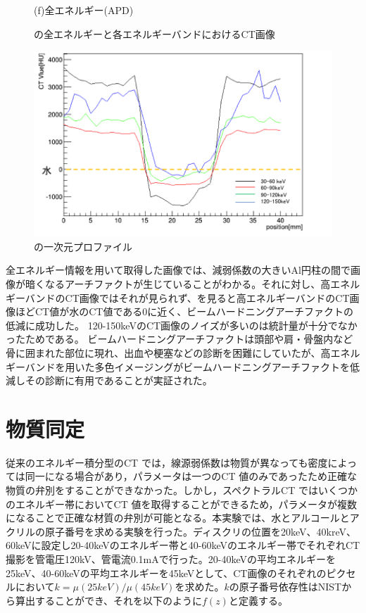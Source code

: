 \begin{figure}[H]
\begin{minipage}{0.5\hsize}
\begin{center}
  \end{center}  
\vspace{-1cm}
\caption*{(f)全エネルギー(APD)}
 \end{minipage}
 \begin{center}
  \caption{の全エネルギーと各エネルギーバンドにおけるCT画像}
  \label{fig:BH_multi}
  \end{center}
\end{figure}

\begin{figure}[H]
 \begin{center}
 \includegraphics[bb=0.000000 0.000000 422.365084 263.018257,width=0.6\hsize]{image2/chapter5/BH_slice.png} 
 \end{center}
 \caption{の一次元プロファイル}
 \label{fig:BH_slice}
\end{figure}

全エネルギー情報を用いて取得した画像では、減弱係数の大きいAl円柱の間で画像が暗くなるアーチファクトが生じていることがわかる。それに対し、高エネルギーバンドのCT画像ではそれが見られず、を見ると高エネルギーバンドのCT画像ほどCT値が水のCT値である0に近く、ビームハードニングアーチファクトの低減に成功した。
120-150keVのCT画像のノイズが多いのは統計量が十分でなかったためである。
ビームハードニングアーチファクトは頭部や肩・骨盤内など骨に囲まれた部位に現れ、出血や梗塞などの診断を困難にしていたが、高エネルギーバンドを用いた多色イメージングがビームハードニングアーチファクトを低減しその診断に有用であることが実証された。


\section{物質同定}
従来のエネルギー積分型のCT では，線源弱係数は物質が異なっても密度によっては同一になる場合があり，パラメータは一つのCT 値のみであったため正確な物質の弁別をすることができなかった。しかし，スペクトラルCT ではいくつかのエネルギー帯においてCT 値を取得することができるため，パラメータが複数になることで正確な材質の弁別が可能となる。本実験では、水とアルコールとアクリルの原子番号を求める実験を行った。ディスクリの位置を20keV、40kreV、60keVに設定し20-40keVのエネルギー帯と40-60keVのエネルギー帯でそれぞれCT撮影を管電圧120kV、管電流0.1mAで行った。20-40keVの平均エネルギーを25keV、40-60keVの平均エネルギーを45keVとして、CT画像のそれぞれのピクセルにおいて$k=\mu(25keV)/\mu(45keV)$を求めた。$k$の原子番号依存性はNISTから算出することができ、それを以下のように$f(z)$と定義する。

